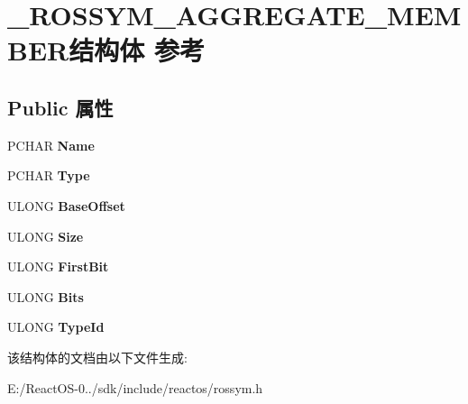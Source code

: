 \hypertarget{struct___r_o_s_s_y_m___a_g_g_r_e_g_a_t_e___m_e_m_b_e_r}{}\section{\+\_\+\+R\+O\+S\+S\+Y\+M\+\_\+\+A\+G\+G\+R\+E\+G\+A\+T\+E\+\_\+\+M\+E\+M\+B\+E\+R结构体 参考}
\label{struct___r_o_s_s_y_m___a_g_g_r_e_g_a_t_e___m_e_m_b_e_r}
\subsection*{Public 属性}
\begin{DoxyCompactItemize}
\item 
\mbox{\label{struct___r_o_s_s_y_m___a_g_g_r_e_g_a_t_e___m_e_m_b_e_r_a68300b300f966a0d1cefde4def14c53c}} 
P\+C\+H\+AR {\bfseries Name}
\item 
\mbox{\label{struct___r_o_s_s_y_m___a_g_g_r_e_g_a_t_e___m_e_m_b_e_r_a929b95b8814216d17057953c195b2cd0}} 
P\+C\+H\+AR {\bfseries Type}
\item 
\mbox{\label{struct___r_o_s_s_y_m___a_g_g_r_e_g_a_t_e___m_e_m_b_e_r_af42821087922020081c9326ab163687d}} 
U\+L\+O\+NG {\bfseries Base\+Offset}
\item 
\mbox{\label{struct___r_o_s_s_y_m___a_g_g_r_e_g_a_t_e___m_e_m_b_e_r_ab5580c26921a33ffbafbfc603b3c8647}} 
U\+L\+O\+NG {\bfseries Size}
\item 
\mbox{\label{struct___r_o_s_s_y_m___a_g_g_r_e_g_a_t_e___m_e_m_b_e_r_adeb4198fdc0c297aad9e5c29b69a9001}} 
U\+L\+O\+NG {\bfseries First\+Bit}
\item 
\mbox{\label{struct___r_o_s_s_y_m___a_g_g_r_e_g_a_t_e___m_e_m_b_e_r_af59c108adda4cfcbbbd6197c1316e67e}} 
U\+L\+O\+NG {\bfseries Bits}
\item 
\mbox{\label{struct___r_o_s_s_y_m___a_g_g_r_e_g_a_t_e___m_e_m_b_e_r_a77529553dcd9a9f79a8b5c16fdf913b0}} 
U\+L\+O\+NG {\bfseries Type\+Id}
\end{DoxyCompactItemize}


该结构体的文档由以下文件生成\+:\begin{DoxyCompactItemize}
\item 
E\+:/\+React\+O\+S-\/0../sdk/include/reactos/rossym.\+h\end{DoxyCompactItemize}

